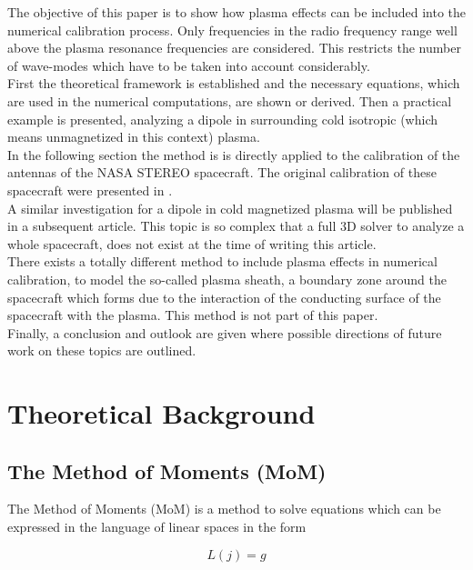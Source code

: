 \documentclass[a4paper,11pt]{article}
\begin{document}
The objective of this paper is to show how plasma effects can be included into the numerical calibration process. Only frequencies in the radio frequency range well above the plasma resonance frequencies are considered. This restricts the number of wave-modes which have to be taken into account considerably.\\

First the theoretical framework is established and the necessary equations, which are used in the numerical computations, are shown or derived. Then a practical example is presented, analyzing a dipole in surrounding cold isotropic (which means unmagnetized in this context) plasma.\\

In the following section the method is is directly applied to the calibration of the antennas of the NASA STEREO spacecraft. The original calibration of these spacecraft were presented in \cite{ossi08}.\\

A similar investigation for a dipole in cold magnetized plasma will be published in a subsequent article. This topic is so complex that a full 3D solver to analyze a whole spacecraft, does not exist at the time of writing this article.\\

There exists a totally different method to include plasma effects in numerical calibration, to model the so-called plasma sheath, a boundary zone around the spacecraft which forms due to the interaction of the conducting surface of the spacecraft with the plasma. This method is not part of this paper.\\

Finally, a conclusion and outlook are given where possible directions of future work on these topics are outlined.

\section{Theoretical Background}
\subsection{The Method of Moments (MoM)}
The Method of Moments (MoM) is a method to solve equations which can be expressed in the language of linear spaces in the form

\begin{equation}\label{eq:linear_operator}
 L(j)=g
\end{equation}
\end{document}
